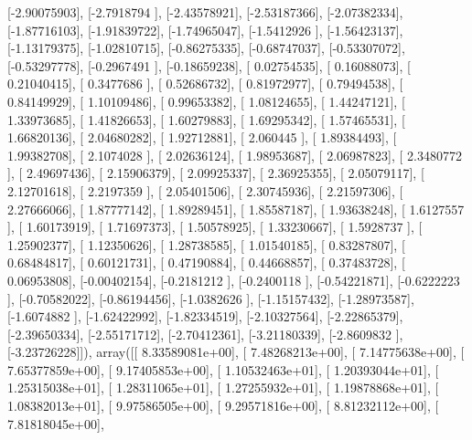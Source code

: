 \documentclass{article}
\begin{document}
       [-2.90075903],
       [-2.7918794 ],
       [-2.43578921],
       [-2.53187366],
       [-2.07382334],
       [-1.87716103],
       [-1.91839722],
       [-1.74965047],
       [-1.5412926 ],
       [-1.56423137],
       [-1.13179375],
       [-1.02810715],
       [-0.86275335],
       [-0.68747037],
       [-0.53307072],
       [-0.53297778],
       [-0.2967491 ],
       [-0.18659238],
       [ 0.02754535],
       [ 0.16088073],
       [ 0.21040415],
       [ 0.3477686 ],
       [ 0.52686732],
       [ 0.81972977],
       [ 0.79494538],
       [ 0.84149929],
       [ 1.10109486],
       [ 0.99653382],
       [ 1.08124655],
       [ 1.44247121],
       [ 1.33973685],
       [ 1.41826653],
       [ 1.60279883],
       [ 1.69295342],
       [ 1.57465531],
       [ 1.66820136],
       [ 2.04680282],
       [ 1.92712881],
       [ 2.060445  ],
       [ 1.89384493],
       [ 1.99382708],
       [ 2.1074028 ],
       [ 2.02636124],
       [ 1.98953687],
       [ 2.06987823],
       [ 2.3480772 ],
       [ 2.49697436],
       [ 2.15906379],
       [ 2.09925337],
       [ 2.36925355],
       [ 2.05079117],
       [ 2.12701618],
       [ 2.2197359 ],
       [ 2.05401506],
       [ 2.30745936],
       [ 2.21597306],
       [ 2.27666066],
       [ 1.87777142],
       [ 1.89289451],
       [ 1.85587187],
       [ 1.93638248],
       [ 1.6127557 ],
       [ 1.60173919],
       [ 1.71697373],
       [ 1.50578925],
       [ 1.33230667],
       [ 1.5928737 ],
       [ 1.25902377],
       [ 1.12350626],
       [ 1.28738585],
       [ 1.01540185],
       [ 0.83287807],
       [ 0.68484817],
       [ 0.60121731],
       [ 0.47190884],
       [ 0.44668857],
       [ 0.37483728],
       [ 0.06953808],
       [-0.00402154],
       [-0.2181212 ],
       [-0.2400118 ],
       [-0.54221871],
       [-0.6222223 ],
       [-0.70582022],
       [-0.86194456],
       [-1.0382626 ],
       [-1.15157432],
       [-1.28973587],
       [-1.6074882 ],
       [-1.62422992],
       [-1.82334519],
       [-2.10327564],
       [-2.22865379],
       [-2.39650334],
       [-2.55171712],
       [-2.70412361],
       [-3.21180339],
       [-2.8609832 ],
       [-3.23726228]]), array([[  8.33589081e+00],
       [  7.48268213e+00],
       [  7.14775638e+00],
       [  7.65377859e+00],
       [  9.17405853e+00],
       [  1.10532463e+01],
       [  1.20393044e+01],
       [  1.25315038e+01],
       [  1.28311065e+01],
       [  1.27255932e+01],
       [  1.19878868e+01],
       [  1.08382013e+01],
       [  9.97586505e+00],
       [  9.29571816e+00],
       [  8.81232112e+00],
       [  7.81818045e+00],
\end{document}
